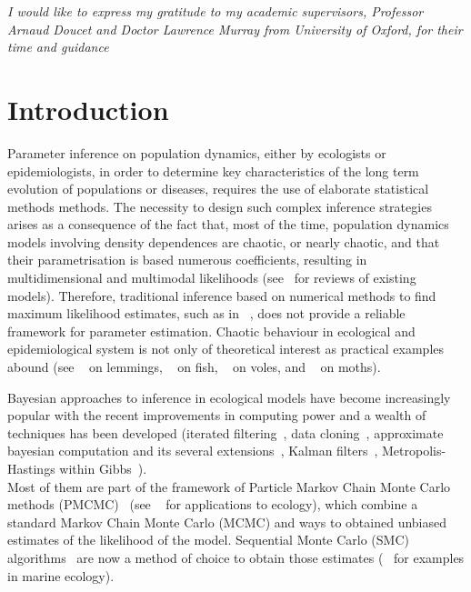\documentclass[12pt]{article}
\begin{document}
	\newpage
	\vspace*{80mm}
		\textit{I would like to express my gratitude to my academic supervisors, Professor Arnaud Doucet and Doctor Lawrence Murray from University of Oxford, for their time and guidance}
	
	\newpage
	
	\listoffigures
	\clearpage
	\listoftables
	\clearpage
	\tableofcontents
	
	\clearpage
	\section{Introduction}
	 Parameter inference on population dynamics, either by ecologists or epidemiologists, in order to determine key characteristics of the long term evolution of populations or diseases, requires the use of elaborate statistical methods methods. The necessity to design such complex inference strategies arises as a consequence of the fact that, most of the time, population dynamics models involving density dependences are chaotic, or nearly chaotic, and that their parametrisation is based numerous coefficients, resulting in multidimensional and multimodal likelihoods (see~\cite{hanski1990density, woiwod1992patterns, turchin2003complex, brook2006strength} for reviews of existing models). Therefore, traditional inference based on numerical methods to find maximum likelihood estimates, such as in ~\cite{kendall1999populations, de2002fitting, valpine2005state, yang2008importance}, does not provide a reliable framework for parameter estimation. Chaotic behaviour in ecological and epidemiological system is not only of theoretical interest as practical examples abound (see ~\cite{kausrud2008linking} on lemmings, ~\cite{anderson2008fishing} on fish, ~\cite{turchin2000living} on voles, and ~\cite{kendall2005population} on moths).

	Bayesian approaches to inference in ecological models have become increasingly popular with the recent improvements in computing power and a wealth of techniques has been developed (iterated filtering~\cite{ionides2006inference}, data cloning~\cite{lele2007data}, approximate bayesian computation and its several extensions~\cite{marin2012approximate}, Kalman filters~\cite{sorenson1960kalman}, Metropolis-Hastings within Gibbs~\cite{geweke2001bayesian}). \\
	Most of them are part of the framework of Particle Markov Chain Monte Carlo methods (PMCMC)~\cite{andrieu2010particle} (see ~\cite{peters2010ecological, gao2012bayesian} for applications to ecology), which combine a standard Markov Chain Monte Carlo (MCMC) and ways to obtained unbiased estimates of the likelihood of the model. Sequential Monte Carlo (SMC) algorithms~\cite{del2004feynman} are now a method of choice to obtain those estimates (~\cite{losa2003sequential, dowd2006sequential, jones2010bayesian} for examples in marine ecology).
	
\end{document}
